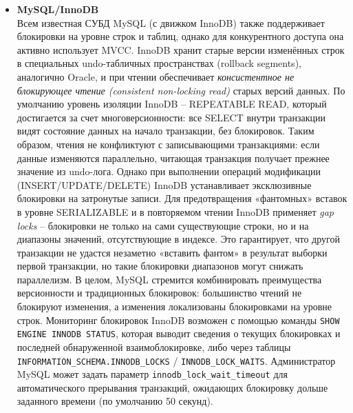 \begin{itemize}
    \item \textbf{MySQL/InnoDB} \autocite{Mysqldoc4} ~\\
    Всем известная СУБД MySQL (с движком InnoDB) также поддерживает блокировки на уровне строк и таблиц, однако для конкурентного доступа она активно использует MVCC. InnoDB хранит старые версии изменённых строк в специальных undo-табличных пространствах (rollback segments), аналогично Oracle, и при чтении обеспечивает \textit{консистентное не блокирующее чтение (consistent non-locking read)} старых версий данных. По умолчанию уровень изоляции InnoDB – REPEATABLE READ, который достигается за счет многоверсионности: все SELECT внутри транзакции видят состояние данных на начало транзакции, без блокировок. Таким образом, чтения не конфликтуют с записывающими транзакциями: если данные изменяются параллельно, читающая транзакция получает прежнее значение из undo-лога. Однако при выполнении операций модификации (INSERT/UPDATE/DELETE) InnoDB устанавливает эксклюзивные блокировки на затронутые записи. Для предотвращения «фантомных» вставок в уровне SERIALIZABLE и в повторяемом чтении InnoDB применяет \textit{gap locks} – блокировки не только на сами существующие строки, но и на диапазоны значений, отсутствующие в индексе. Это гарантирует, что другой транзакции не удастся незаметно «вставить фантом» в результат выборки первой транзакции, но такие блокировки диапазонов могут снижать параллелизм. В целом, MySQL стремится комбинировать преимущества версионности и традиционных блокировок: большинство чтений не блокируют изменения, а изменения локализованы блокировками на уровне строк. Мониторинг блокировок InnoDB возможен с помощью команды \texttt{SHOW ENGINE INNODB STATUS}, которая выводит сведения о текущих блокировках и последней обнаруженной взаимоблокировке, либо через таблицы \texttt{INFORMATION\_SCHEMA.INNODB\_LOCKS} / \texttt{INNODB\_LOCK\_WAITS}. Администратор MySQL может задать параметр \texttt{innodb\_lock\_wait\_timeout} для автоматического прерывания транзакций, ожидающих блокировку дольше заданного времени (по умолчанию 50 секунд).
 \end{itemize}

